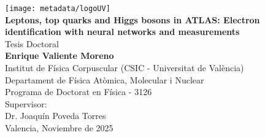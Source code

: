 \begin{titlepage}
    \begin{center}
        \vspace*{1cm} 
        \texttt{[image: metadata/logoUV]}\\[15mm]

        {\Large{\textbf{Leptons, top quarks and Higgs bosons in ATLAS: Electron identification with neural networks and \ttH measurements}}}\\[15mm]

        Tesis Doctoral\\
        {\large{\textbf{Enrique Valiente Moreno}}}\\[15mm]

        Institut de Física Corpuscular (CSIC - Universitat de València)\\
        Departament de Física Atòmica, Molecular i Nuclear\\
        Programa de Doctorat en Física - 3126\\[15mm]

        Supervisor:\\
        Dr. Joaquín Poveda Torres\\[15mm]

        Valencia, Noviembre de 2025
    \end{center}

\end{titlepage}
